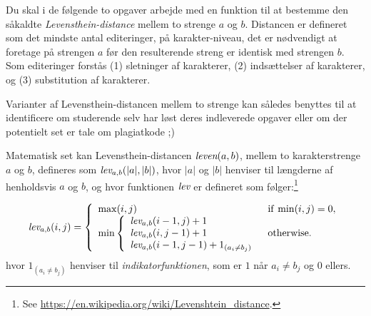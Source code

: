 Du skal i de følgende to opgaver arbejde med en funktion til at
bestemme den såkaldte \emph{Levensthein-distance} mellem to strenge
$a$ og $b$. Distancen er defineret som det mindste antal editeringer,
på karakter-niveau, det er nødvendigt at foretage på strengen $a$ før
den resulterende streng er identisk med strengen $b$. Som editeringer
forstås (1) sletninger af karakterer, (2) indsættelser af karakterer,
og (3) substitution af karakterer.

Varianter af Levensthein-distancen mellem to strenge kan således
benyttes til at identificere om studerende selv har løst deres
indleverede opgaver eller om der potentielt set er tale om plagiatkode
;)

Matematisk set kan Levensthein-distancen
${\emph{leven}}(a,b)$, mellem to karakterstrenge $a$ og
$b$, defineres som ${\emph{lev}}_{a,b}(|a|,|b|)$, hvor
$|a|$ og $|b|$ henviser til længderne af henholdsvis $a$ og $b$, og
hvor funktionen ${\emph{lev}}$ er defineret som
følger:\footnote{See
\url{https://en.wikipedia.org/wiki/Levenshtein_distance}.}

  \[
  {\emph{lev}}_{a,b}(i,j) = \left \{ \begin{array}{ll} \mathrm{max}(i,j) & \mathrm{if}~\mathrm{min}(i,j) = 0, \\
    \mathrm{min} \left \{ \begin{array}{l}{\emph{lev}}_{a,b}(i-1,j)+1 \\
                                          {\emph{lev}}_{a,b}(i,j-1)+1 \\
                                          {\emph{lev}}_{a,b}(i-1,j-1)+1_{(a_i\not=b_j)} \end{array} \right . & \mathrm{otherwise}. \end{array} \right .
  \]
  hvor $1_{(a_i\not=b_j)}$ henviser til \emph{indikatorfunktionen}, som er $1$ når $a_i\not=b_j$ og $0$ ellers.


